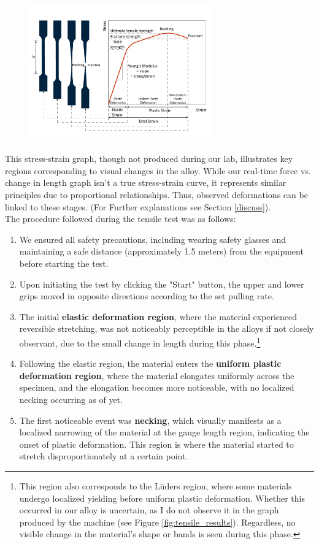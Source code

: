 \documentclass{article}
\begin{document}
\newpage
\begin{figure}[H]
    \centering    
    \includegraphics[width=0.7\textwidth]{images/simwiki-stress-strain-shape-evolution.png}
    \label{fig:alloys_next_graph}
\end{figure}
This stress-strain graph, though not produced during our lab, illustrates key regions corresponding to visual changes in the alloy. While our real-time force vs. change in length graph isn't a true stress-strain curve, it represents similar principles due to proportional relationships. Thus, observed deformations can be linked to these stages. (For Further explanations see Section \ref{discuss}).\\[8pt]
The procedure followed during the tensile test was as follows: 
\begin{enumerate}
    \item We ensured all safety precautions, including wearing safety glasses and maintaining a safe distance (approximately 1.5 meters) from the equipment before starting the test.
    \item Upon initiating the test by clicking the "Start" button, the upper and lower grips moved in opposite directions according to the set pulling rate.
    \item The initial \textbf{elastic deformation region}, where the material experienced reversible stretching, was not noticeably perceptible in the alloys if not closely observant, due to the small change in length during this phase.\footnote{This region also corresponds to the Lüders region, where some materials undergo localized yielding before uniform plastic deformation. Whether this occurred in our alloy is uncertain, as I do not observe it in the graph produced by the machine (see Figure \ref{fig:tensile_results}). Regardless, no visible change in the material's shape or bands is seen during this phase.}
    \item Following the elastic region, the material enters the \textbf{uniform plastic deformation region}, where the material elongates uniformly across the specimen, and the elongation becomes more noticeable, with no localized necking occurring as of yet.
    \item The first noticeable event was \textbf{necking}, which visually manifests as a localized narrowing of the material at the gauge length region, indicating the onset of plastic deformation. This region is where the material started to stretch disproportionately at a certain point.
\end{enumerate}
\end{document}
